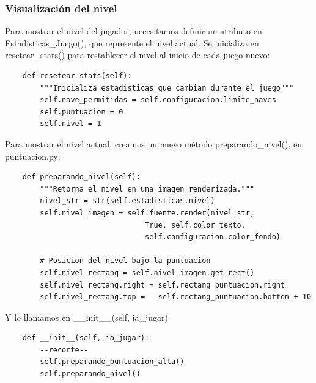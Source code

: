 \subsubsection{Visualización del nivel}

Para mostrar el nivel del jugador, necesitamos definir un atributo en {\ttfamily Estadisticas\_Juego()}, que represente el nivel actual. 
Se inicializa en {\ttfamily resetear\_stats()} para restablecer el nivel al inicio de cada juego nuevo:




\hspace{-2.4cm}{\ttfamily \scriptsize stats}

\vspace{-0.2cm}
\hspace{-2.1cm}{\ttfamily \scriptsize \_juego.py}\vspace{-0.84cm}
\begin{lstlisting}
    def resetear_stats(self):
        """Inicializa estadisticas que cambian durante el juego"""
        self.nave_permitidas = self.configuracion.limite_naves
        self.puntuacion = 0
        self.nivel = 1
\end{lstlisting}
Para mostrar el nivel actual, creamos un nuevo método {\ttfamily  preparando\_nivel()}, en {\ttfamily puntuacion.py}:



 
\hspace{-2.9cm}{\ttfamily \scriptsize puntuacion.py}  \vspace{-0.5cm}
\begin{lstlisting}		
    def preparando_nivel(self): 
        """Retorna el nivel en una imagen renderizada.""" 
        nivel_str = str(self.estadisticas.nivel)
        self.nivel_imagen = self.fuente.render(nivel_str,
                                True, self.color_texto, 
                                self.configuracion.color_fondo)
        
        # Posicion del nivel bajo la puntuacion
        self.nivel_rectang = self.nivel_imagen.get_rect()
        self.nivel_rectang.right = self.rectang_puntuacion.right
        self.nivel_rectang.top =   self.rectang_puntuacion.bottom + 10	
\end{lstlisting}

Y lo llamamos en {\ttfamily  \_\_init\_\_(self, ia\_jugar)} 

\hspace{-2.9cm}{\ttfamily \scriptsize puntuacion.py}  \vspace{-0.5cm}
\begin{lstlisting}	
	def __init__(self, ia_jugar):
        --recorte-- 
	    self.preparando_puntuacion_alta() 
	    self.preparando_nivel()	
\end{lstlisting}

